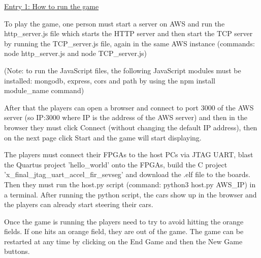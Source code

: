\documentclass[12pt,a4paper]{article}
\begin{document}
\underline{\scriptsize Entry 1: How to run the game}
\par
{\scriptsize To play the game, one person must start a server on AWS and run the http\_server.js 
file which starts the HTTP server and then start the TCP server by running the 
TCP\_server.js file, again in the same AWS instance (commands: 
node http\_server.js and node TCP\_server.js)}
\par
{\scriptsize (Note: to run the JavaScript files, the following JavaScript modules must be 
installed: mongodb, express, cors and path by using the 
npm install module\_name command)}
\par
{\scriptsize After that the players can open a browser and connect to port 3000 of the AWS server 
(so IP:3000 where IP is the address of the AWS server) and then in the browser they 
must click Connect (without changing the default IP address), then on the next page 
click Start and the game will start displaying.}
\par
{\scriptsize The players must connect their FPGAs to the host PCs via JTAG UART, blast the Quartus 
project 'hello\_world' onto the FPGAs, build the C project 'x\_final\_jtag\_uart\_accel\_fir\_sevseg' 
and download the .elf file to the boards. 
Then they must run the host.py script (command: python3 host.py {AWS\_IP}) in a 
terminal. After running the python script, the cars show up in the browser and the 
players can already start steering their cars.}
\par
{\scriptsize Once the game is running the players need to try to avoid hitting the orange fields. 
If one hits an orange field, they are out of the game. The game can be restarted at 
any time by clicking on the End Game and then the New Game buttons.}
\end{document}
